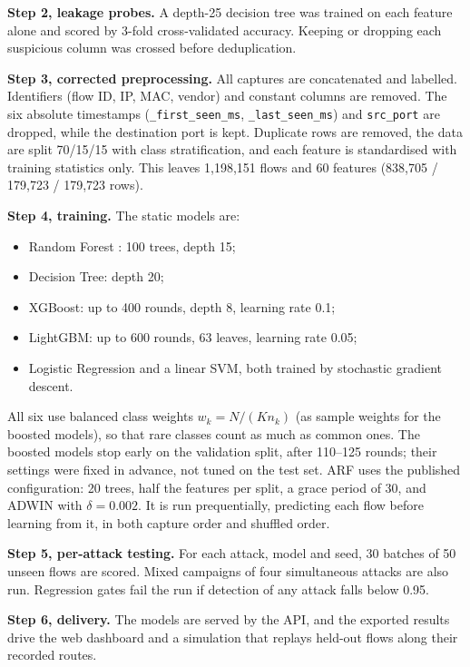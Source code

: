 \documentclass[conference]{IEEEtran}
\newcommand{\col}[1]{\texttt{\small #1}}
\begin{document}
\textbf{Step 2, leakage probes.} A depth-25 decision tree was trained on each feature alone and scored by 3-fold cross-validated accuracy. Keeping or dropping each suspicious column was crossed before deduplication.

\textbf{Step 3, corrected preprocessing.} All captures are concatenated and labelled. Identifiers (flow ID, IP, MAC, vendor) and constant columns are removed. The six absolute timestamps (\col{*\_first\_seen\_ms}, \col{*\_last\_seen\_ms}) and \col{src\_port} are dropped, while the destination port is kept. Duplicate rows are removed, the data are split 70/15/15 with class stratification, and each feature is standardised with training statistics only. This leaves 1,198,151 flows and 60 features (838,705 / 179,723 / 179,723 rows).

\textbf{Step 4, training.} The static models are:
\begin{itemize}
    \item Random Forest \cite{b16}: 100 trees, depth 15;
    \item Decision Tree: depth 20;
    \item XGBoost: up to 400 rounds, depth 8, learning rate 0.1;
    \item LightGBM: up to 600 rounds, 63 leaves, learning rate 0.05;
    \item Logistic Regression and a linear SVM, both trained by stochastic gradient descent.
\end{itemize}
All six use balanced class weights $w_k = N/(K n_k)$ (as sample weights for the boosted models), so that rare classes count as much as common ones. The boosted models stop early on the validation split, after 110--125 rounds; their settings were fixed in advance, not tuned on the test set. ARF uses the published configuration: 20 trees, half the features per split, a grace period of 30, and ADWIN with $\delta = 0.002$. It is run prequentially, predicting each flow before learning from it, in both capture order and shuffled order.

\textbf{Step 5, per-attack testing.} For each attack, model and seed, 30 batches of 50 unseen flows are scored. Mixed campaigns of four simultaneous attacks are also run. Regression gates fail the run if detection of any attack falls below 0.95.

\textbf{Step 6, delivery.} The models are served by the API, and the exported results drive the web dashboard and a simulation that replays held-out flows along their recorded routes.
\end{document}
